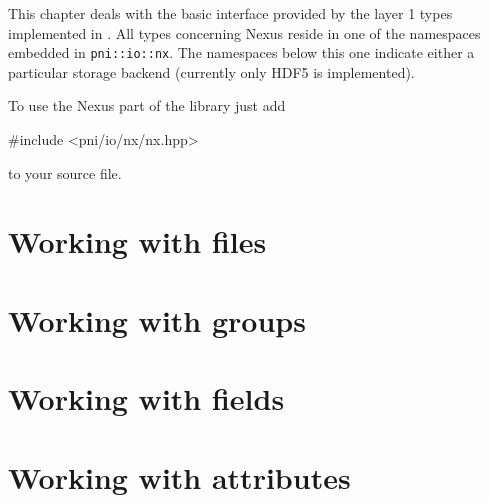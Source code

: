 
This chapter deals with the basic interface provided by the layer 1 types
implemented in \libpniio. All types concerning Nexus reside in one of the
namespaces embedded in {\tt pni::io::nx}. The namespaces below this one 
indicate either a particular storage backend (currently only HDF5 is
implemented).

To use the Nexus part of the library just add 
\begin{cppcode}
#include <pni/io/nx/nx.hpp>
\end{cppcode}
to your source file. 

\section{Working with files}



\section{Working with groups}



\section{Working with fields}



\section{Working with attributes}





